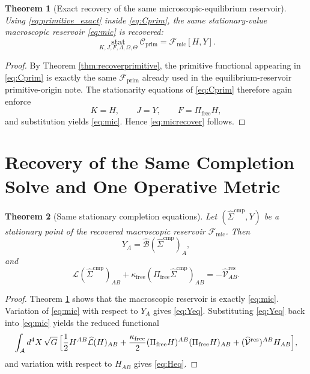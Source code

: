 \documentclass[11pt]{article}
\newcommand{\Sub}{\mathcal A}
\newcommand{\CompLift}{\widehat\Sigma^{\mathrm{cmp}}}
\newcommand{\ResidualLift}{\widehat{\mathcal V}^{\mathrm{res}}}
\newcommand{\SubGaugeVec}{\widehat{\mathcal B}}
\newcommand{\SubReducedEin}{\widehat{\mathcal L}}
\newcommand{\FreeProj}{\Pi_{\mathrm{free}}}
\newcommand{\GaugeAux}{Y}
\newcommand{\MicFunctional}{\mathscr F_{\mathrm{mic}}}
\newcommand{\PrimFunctional}{\mathscr F_{\mathrm{prim}}}
\newcommand{\FreeStiff}{\kappa_{\mathrm{free}}}
\newcommand{\PrimStrain}{K}
\newcommand{\PrimNeutral}{J}
\newcommand{\PrimFree}{F}
\newcommand{\StrainMult}{\Lambda}
\newcommand{\NeutralMult}{\Omega}
\newcommand{\FreeMult}{\Theta}
\newtheorem{theorem}{Theorem}
\begin{document}
\begin{theorem}[Exact recovery of the same microscopic-equilibrium reservoir]
\label{thm:recovermic}
Using \eqref{eq:primitive_exact} inside \eqref{eq:Cprim}, the same stationary-value macroscopic reservoir \eqref{eq:mic} is recovered:
\begin{equation}
\operatorname*{stat}_{\PrimStrain,\PrimNeutral,\PrimFree,\StrainMult,\NeutralMult,\FreeMult}
\mathscr C_{\mathrm{prim}}
=
\MicFunctional[H,\GaugeAux].
\label{eq:micrecover}
\end{equation}
\end{theorem}

\begin{proof}
By Theorem \ref{thm:recoverprimitive}, the primitive functional appearing in \eqref{eq:Cprim} is exactly the same \(\PrimFunctional\) already used in the equilibrium-reservoir primitive-origin note. The stationarity equations of \eqref{eq:Cprim} therefore again enforce
\[
\PrimStrain=H,
\qquad
\PrimNeutral=\GaugeAux,
\qquad
\PrimFree=\FreeProj H,
\]
and substitution yields \eqref{eq:mic}. Hence \eqref{eq:micrecover} follows.
\end{proof}

\section{Recovery of the Same Completion Solve and One Operative Metric}

\begin{theorem}[Same stationary completion equations]
\label{thm:stationary}
Let \((\CompLift,\GaugeAux)\) be a stationary point of the recovered macroscopic reservoir \(\MicFunctional\). Then
\begin{equation}
\GaugeAux_A=\SubGaugeVec(\CompLift)_A,
\label{eq:Yeq}
\end{equation}
and
\begin{equation}
\SubReducedEin(\CompLift)_{AB}
+\FreeStiff(\FreeProj\CompLift)_{AB}
=
-\ResidualLift_{AB}.
\label{eq:Heq}
\end{equation}
\end{theorem}

\begin{proof}
Theorem \ref{thm:recovermic} shows that the macroscopic reservoir is exactly \eqref{eq:mic}. Variation of \eqref{eq:mic} with respect to \(\GaugeAux_A\) gives \eqref{eq:Yeq}. Substituting \eqref{eq:Yeq} back into \eqref{eq:mic} yields the reduced functional
\[
\int_{\Sub} d^4X\,\sqrt{G}\,
\Bigl[
\frac12 H^{AB}\SubReducedEin(H)_{AB}
+\frac{\FreeStiff}{2}(\FreeProj H)^{AB}(\FreeProj H)_{AB}
+(\ResidualLift)^{AB}H_{AB}
\Bigr],
\]
and variation with respect to \(H_{AB}\) gives \eqref{eq:Heq}.
\end{proof}
\end{document}
